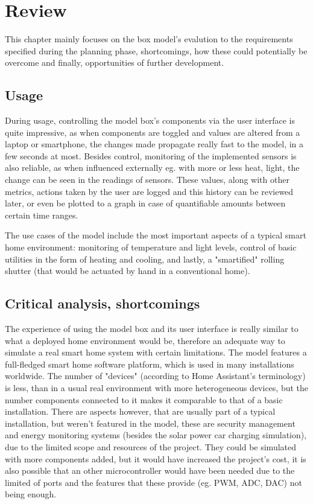 \chapter{Review}

This chapter mainly focuses on the box model's evalution to the requirements specified during the planning phase, shortcomings, how these could potentially be overcome and finally, opportunities of further development.

\section{Usage}

During usage, controlling the model box's components via the user interface is quite impressive, as when components are toggled and values are altered from a laptop or smartphone, the changes made propagate really fast to the model, in a few seconds at most. Besides control, monitoring of the implemented sensors is also reliable, as when influenced externally eg. with more or less heat, light, the change can be seen in the readings of sensors. These values, along with other metrics, actions taken by the user are logged and this history can be reviewed later, or even be plotted to a graph in case of quantifiable amounts between certain time ranges.


The use cases of the model include the most important aspects of a typical smart home environment: monitoring of temperature and light levels, control of basic utilities in the form of heating and cooling, and lastly, a "smartified" rolling shutter (that would be actuated by hand in a conventional home).

\section{Critical analysis, shortcomings}

The experience of using the model box and its user interface is really similar to what a deployed home environment would be, therefore an adequate way to simulate a real smart home system with certain limitations. The model features a full-fledged smart home software platform, which is used in many installations worldwide. %
The number of "devices" (according to Home Assistant's terminology) is less, than in a usual real environment with more heterogeneous devices, but the number components connected to it makes it comparable to that of a basic installation.
There are aspects however, that are usually part of a typical installation, but weren't featured in the model, these are security management and energy monitoring systems (besides the solar power car charging simulation), due to the limited scope and resources of the project. They could be simulated with more components added, but it would have increased the project's cost, it is also possible that an other microcontroller would have been needed due to the limited of ports and the features that these provide (eg. PWM, ADC, DAC) not being enough.

